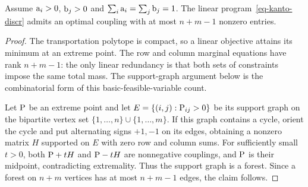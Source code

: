 \begin{prop}\label{prop-sparse-optimal-plans}
	Assume $\a_i>0$, $\b_j>0$ and $\sum_i \a_i=\sum_j \b_j=1$. The linear program~\eqref{eq-kanto-discr} admits an optimal coupling with at most $n+m-1$ nonzero entries.
\end{prop}
\begin{proof}
	The transportation polytope is compact, so a linear objective attains its minimum at an extreme point. The row and column marginal equations have rank $n+m-1$: the only linear redundancy is that both sets of constraints impose the same total mass. The support-graph argument below is the combinatorial form of this basic-feasible-variable count.

	Let $\P$ be an extreme point and let $E=\{(i,j):\P_{ij}>0\}$ be its support graph on the bipartite vertex set $\{1,\ldots,n\}\cup\{1,\ldots,m\}$. If this graph contains a cycle, orient the cycle and put alternating signs $+1,-1$ on its edges, obtaining a nonzero matrix $H$ supported on $E$ with zero row and column sums. For sufficiently small $t>0$, both $\P+tH$ and $\P-tH$ are nonnegative couplings, and $\P$ is their midpoint, contradicting extremality. Thus the support graph is a forest. Since a forest on $n+m$ vertices has at most $n+m-1$ edges, the claim follows.
\end{proof}

